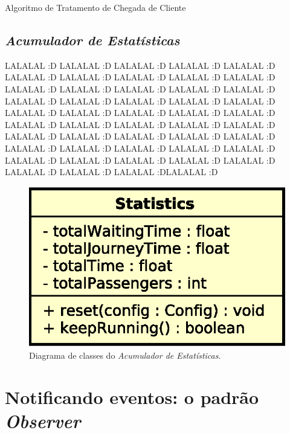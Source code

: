 \begin{algorithm}[H]
\begin{center}
\begin{algorithmic}[1]
  \State {}
\EndFunction
\end{algorithmic}
\end{center}
\caption
   {\label{alg:timer:clientarrival}Algoritmo de Tratamento de Chegada de Cliente}
\end{algorithm}

\subsection{\textit{Acumulador de Estatísticas}}

LALALAL :D LALALAL :D LALALAL :D LALALAL :D LALALAL :D LALALAL :D LALALAL :D
LALALAL :D LALALAL :D LALALAL :D LALALAL :D LALALAL :D LALALAL :D LALALAL :D
LALALAL :D LALALAL :D LALALAL :D LALALAL :D LALALAL :D LALALAL :D LALALAL :D
LALALAL :D LALALAL :D LALALAL :D LALALAL :D LALALAL :D LALALAL :D LALALAL :D
LALALAL :D LALALAL :D LALALAL :D LALALAL :D LALALAL :D LALALAL :D LALALAL :D
LALALAL :D LALALAL :D LALALAL :D LALALAL :D LALALAL :D LALALAL :D LALALAL :D
LALALAL :D LALALAL :D LALALAL :D LALALAL :D LALALAL :D LALALAL :DLALALAL :D

\begin{figure}[htb!]
  \centering
  \includegraphics[scale=0.6]{img/Stats.eps}
  \caption{Diagrama de classes do \textit{Acumulador de Estatísticas}.}
\label{fig:diagram:stats}
\end{figure}

\section{\label{sec:model:notify}Notificando eventos: o padrão
\textit{Observer}}

